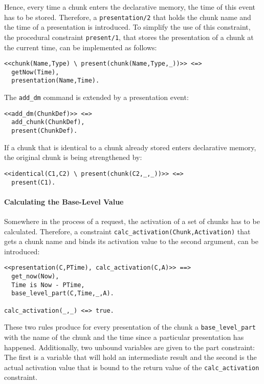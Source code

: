Hence, every time a chunk enters the declarative memory, the time of this event has to be stored. Therefore, a \lstinline|presentation/2| that holds the chunk name and the time of a presentation is introduced. To simplify the use of this constraint, the procedural constraint \lstinline|present/1|, that stores the presentation of a chunk at the current time, can be implemented as follows:

\begin{lstlisting}
<<chunk(Name,Type) \ present(chunk(Name,Type,_))>> <=> 
  getNow(Time),
  presentation(Name,Time).
\end{lstlisting}

The \lstinline|add_dm| command is extended by a presentation event:

\begin{lstlisting}
<<add_dm(ChunkDef)>> <=> 
  add_chunk(ChunkDef), 
  present(ChunkDef). 
\end{lstlisting}

If a chunk that is identical to a chunk already stored enters declarative memory, the original chunk is being strengthened by:

\begin{lstlisting}
<<identical(C1,C2) \ present(chunk(C2,_,_))>> <=> 
  present(C1).
\end{lstlisting}

\paragraph{Calculating the Base-Level Value}

Somewhere in the process of a request, the activation of a set of chunks has to be calculated. Therefore, a constraint \lstinline|calc_activation(Chunk,Activation)|  that gets a chunk name and binds its activation value to the second argument, can be introduced:

\begin{lstlisting}
<<presentation(C,PTime), calc_activation(C,A)>> ==> 
  get_now(Now), 
  Time is Now - PTime, 
  base_level_part(C,Time,_,A).
  
calc_activation(_,_) <=> true.
\end{lstlisting}

These two rules produce for every presentation of the chunk a \lstinline|base_level_part| with the name of the chunk and the time since a particular presentation has happened. Additionally, two unbound variables are given to the part constraint: The first is a variable that will hold an intermediate result and the second is the actual activation value that is bound to the return value of the \lstinline|calc_activation| constraint.

